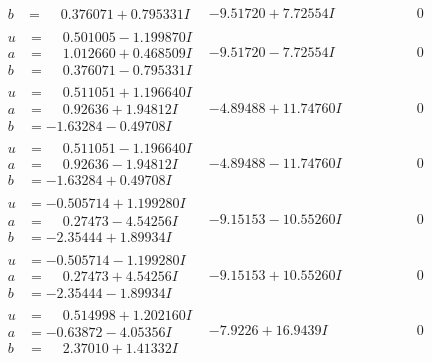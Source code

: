 \documentclass[1p]{elsarticle_modified}
\theoremstyle{definition}
\begin{document}
$$\begin{array}{c|c|c}
\begin{aligned}
b &= \phantom{-}0.376071 + 0.795331 I\end{aligned}
 & -9.51720 + 7.72554 I & \phantom{-0.000000 } 0 \\ \hline\begin{aligned}
u &= \phantom{-}0.501005 - 1.199870 I \\
a &= \phantom{-}1.012660 + 0.468509 I \\
b &= \phantom{-}0.376071 - 0.795331 I\end{aligned}
 & -9.51720 - 7.72554 I & \phantom{-0.000000 } 0 \\ \hline\begin{aligned}
u &= \phantom{-}0.511051 + 1.196640 I \\
a &= \phantom{-}0.92636 + 1.94812 I \\
b &= -1.63284 - 0.49708 I\end{aligned}
 & -4.89488 + 11.74760 I & \phantom{-0.000000 } 0 \\ \hline\begin{aligned}
u &= \phantom{-}0.511051 - 1.196640 I \\
a &= \phantom{-}0.92636 - 1.94812 I \\
b &= -1.63284 + 0.49708 I\end{aligned}
 & -4.89488 - 11.74760 I & \phantom{-0.000000 } 0 \\ \hline\begin{aligned}
u &= -0.505714 + 1.199280 I \\
a &= \phantom{-}0.27473 - 4.54256 I \\
b &= -2.35444 + 1.89934 I\end{aligned}
 & -9.15153 - 10.55260 I & \phantom{-0.000000 } 0 \\ \hline\begin{aligned}
u &= -0.505714 - 1.199280 I \\
a &= \phantom{-}0.27473 + 4.54256 I \\
b &= -2.35444 - 1.89934 I\end{aligned}
 & -9.15153 + 10.55260 I & \phantom{-0.000000 } 0 \\ \hline\begin{aligned}
u &= \phantom{-}0.514998 + 1.202160 I \\
a &= -0.63872 - 4.05356 I \\
b &= \phantom{-}2.37010 + 1.41332 I\end{aligned}
 & -7.9226 + 16.9439 I & \phantom{-0.000000 } 0 \\ \hline\begin{aligned}

\end{aligned}
\end{array}$$
\end{document}
